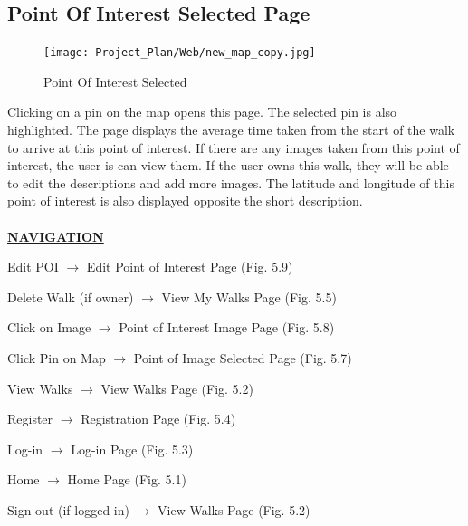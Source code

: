 \documentclass[12pt]{article}
\begin{document}
\subsection{Point Of Interest Selected Page}
\begin{figure}[htp]
\centering
\texttt{[image: Project\_Plan/Web/new\_map\_copy.jpg]}
\caption{Point Of Interest Selected}
\label{Point Of Interest Selected}
\end{figure}
\par{Clicking on a pin on the map opens this page. The selected pin is also highlighted. The page displays the average time taken from the start of the walk to arrive at this point of interest. If there are any images taken from this point of interest, the user is can view them. If the user owns this walk, they will be able to edit the descriptions and add more images. The latitude and longitude of this point of interest is also displayed opposite the short description. \\ \\}
\textbf{\uline{NAVIGATION}}
\par{Edit POI $\rightarrow$ Edit Point of Interest Page (Fig. 5.9)}
\par{Delete Walk (if owner) $\rightarrow$ View My Walks Page (Fig. 5.5)}
\par{Click on Image $\rightarrow$ Point of Interest Image Page (Fig. 5.8)}
\par{Click Pin on Map $\rightarrow$ Point of Image Selected Page (Fig. 5.7)}
\par{View Walks $\rightarrow$ View Walks Page (Fig. 5.2)}
\par{Register $\rightarrow$ Registration Page (Fig. 5.4)}
\par{Log-in $\rightarrow$ Log-in Page (Fig. 5.3)}
\par{Home $\rightarrow$ Home Page (Fig. 5.1)}
\par{Sign out (if logged in) $\rightarrow$ View Walks Page (Fig. 5.2)}
\clearpage
\end{document}
